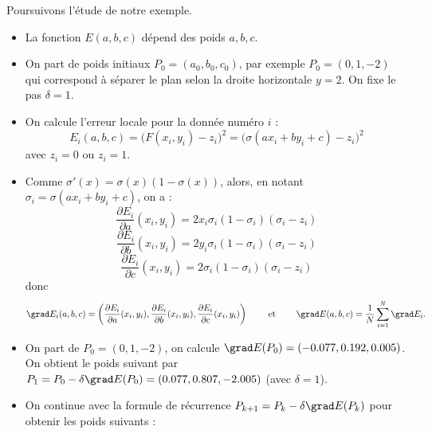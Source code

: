 \documentclass[11pt,class=report,crop=false]{standalone}
\begin{document}
\begin{exemple}
Poursuivons l'étude de notre exemple.
\begin{itemize}
  \item La fonction $E(a,b,c)$ dépend des poids $a,b,c$.
  
  \item On part de poids initiaux $P_0 = (a_0,b_0,c_0)$, par exemple $P_0 = (0,1,-2)$ qui correspond à séparer le plan selon la droite horizontale $y=2$. 
  On fixe le pas $\delta = 1$.
  
  \item On calcule l'erreur locale pour la donnée numéro $i$ :
  $$E_i(a,b,c) = \big( F(x_i,y_i) - z_i \big)^2 = \big( \sigma(ax_i + by_i + c) - z_i \big)^2$$
  avec $z_i = 0$ ou $z_i=1$.
   
  \item Comme $\sigma'(x)= \sigma(x)(1-\sigma(x))$, alors, en notant $\sigma_i = \sigma(ax_i+by_i+c)$, on a :
  $$\frac{\partial E_i}{\partial a}(x_i,y_i) = 2 x_i  \sigma_i(1-\sigma_i)(\sigma_i - z_i)$$
  $$\frac{\partial E_i}{\partial b}(x_i,y_i) = 2 y_i \sigma_i(1-\sigma_i)(\sigma_i - z_i)$$
  $$\frac{\partial E_i}{\partial c}(x_i,y_i) = 2 \sigma_i(1-\sigma_i)(\sigma_i - z_i)$$ 
  donc 
  {\small
  $$\grad E_i(a,b,c) = \left(\frac{\partial E_i}{\partial a}(x_i,y_i), \frac{\partial E_i}{\partial b}(x_i,y_i), \frac{\partial E_i}{\partial c}(x_i,y_i) \right)
  \qquad \text{ et  } \qquad 
  \grad E(a,b,c) = \frac 1N \sum_{i=1}^N \grad E_i.$$
  }
 
  \item On part de $P_0 = (0,1,-2)$, on calcule $\grad E(P_0) = (-0.077, 0.192, 0.005)$. On obtient le poids suivant par $P_1 = P_0 - \delta \grad E(P_0) = (0.077,    0.807,    -2.005)$ (avec $\delta = 1$).   
     
  \item On continue avec la formule de récurrence $P_{k+1} = P_k - \delta \grad E(P_k)$ pour obtenir les poids suivants :


\end{itemize}
\end{exemple}
\end{document}
